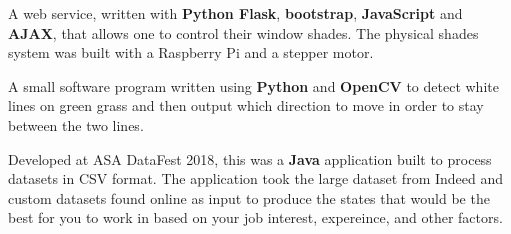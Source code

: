 \documentclass[10pt,a4paper,normalphoto]{altacv}
\begin{document}
  \divider

  A web service, written with \textbf{Python Flask}, \textbf{bootstrap}, \textbf{JavaScript} and \textbf{AJAX}, that allows one to control their window shades.
  The physical shades system was built with a Raspberry Pi and a stepper motor.

  \divider

  A small software program written using \textbf{Python} and \textbf{OpenCV} to detect white lines on green grass and then output which direction to move in order to stay between the two lines.

  \divider

  Developed at ASA DataFest 2018, this was a \textbf{Java} application built to process datasets in CSV format.
  The application took the large dataset from Indeed and custom datasets found online as input to produce the states that would be the best for you to work in based on your job interest, expereince, and other factors.

\medskip
\end{document}
